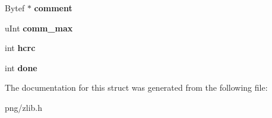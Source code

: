 \begin{DoxyCompactItemize}
\item 
Bytef $\ast$ {\bfseries comment}\hypertarget{structgz__header__s_a1d4fd0807e838ce4bfde54aa021e18e9}{}\label{structgz__header__s_a1d4fd0807e838ce4bfde54aa021e18e9}

\item 
u\+Int {\bfseries comm\+\_\+max}\hypertarget{structgz__header__s_aa0529f45e5c08b3009cfc2a61a86aea0}{}\label{structgz__header__s_aa0529f45e5c08b3009cfc2a61a86aea0}

\item 
int {\bfseries hcrc}\hypertarget{structgz__header__s_a29fa8de3acff8d8c7bad61dc924d8564}{}\label{structgz__header__s_a29fa8de3acff8d8c7bad61dc924d8564}

\item 
int {\bfseries done}\hypertarget{structgz__header__s_ab8fd11f59b76a7d031e24bede8679d9d}{}\label{structgz__header__s_ab8fd11f59b76a7d031e24bede8679d9d}

\end{DoxyCompactItemize}


The documentation for this struct was generated from the following file\+:\begin{DoxyCompactItemize}
\item 
png/zlib.\+h\end{DoxyCompactItemize}
